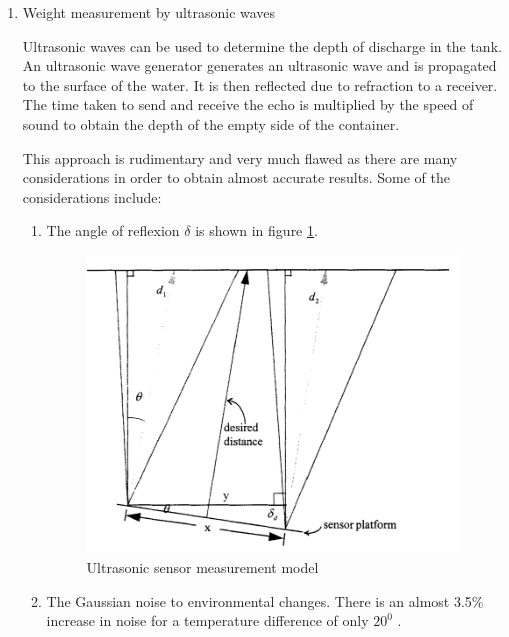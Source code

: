 \begin{enumerate}
    \item Weight measurement by ultrasonic waves
    \par
    Ultrasonic waves can be used to determine the depth of discharge in the tank. An ultrasonic wave generator generates an ultrasonic wave and is propagated to the surface of the water. It is then reflected due to refraction to a receiver. The time taken to send and receive the echo is multiplied by the speed of sound to obtain the depth of the empty side of the container. \par 
    This approach is rudimentary and very much flawed as there are many considerations in order to obtain almost accurate results. Some of the considerations include:
    \begin{enumerate}
        \item The angle of reflexion $\delta$ is shown in figure \ref{fig:ultrasonic sensor measurement model}.
        \begin{figure}[H]
            \centering
            \includegraphics{Figures/angleOfReflection-1.png}
            \caption[Ultrasonic sensor measurement model]{Ultrasonic sensor measurement model \cite{chang1996ultrasonic}}
            \label{fig:ultrasonic sensor measurement model}
        \end{figure}
        \item The Gaussian noise to environmental changes. There is an almost 3.5\% increase in noise for a temperature difference of only $20^{0}$ \cite{chang1996ultrasonic}.
    \end{enumerate}

\end{enumerate}
